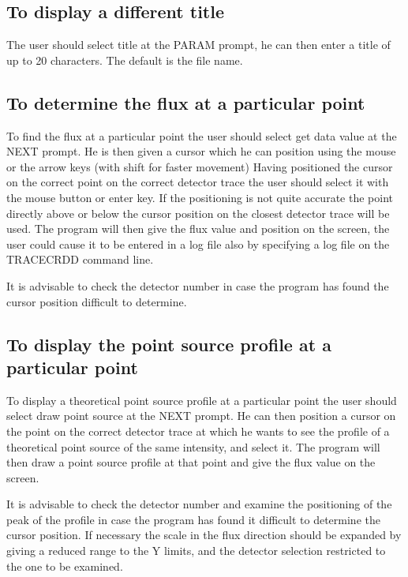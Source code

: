 \documentclass[twoside,11pt]{starlink}
\begin{document}
\subsection{To display a different title}
The user should select title at the PARAM prompt, he can then enter a title of
up to 20 characters. The default is the file name.
\subsection{To determine the flux at a particular point}
To find the flux at a particular point the user should select get data value at
the NEXT prompt. He is then given a cursor which he can position using the mouse
or the arrow keys (with shift for faster movement) Having positioned the cursor
on the correct point on the correct detector trace the user should select it
with the mouse button or enter key. If the positioning is not quite accurate
the point directly above or below the cursor position on the closest detector
trace will be used. The program will then give the flux value and position on
the screen, the user could cause it to be entered in a log file also by
specifying a log file on the TRACECRDD command line.
\begin{small}
\end{small}
It is advisable to check the detector number in case the program has found the
cursor position difficult to determine.
\subsection{To display the point source profile at a particular point}
To display a theoretical point source profile at a particular point the user
should select draw point source at the NEXT prompt. He can then position a
cursor on the point on the correct detector trace at which he wants to see the
profile of a theoretical point source of the same intensity, and select it. The
program will then draw a point source profile at that point and give the flux
value on the screen.
\begin{small}
\end{small}
It is advisable to check the detector number and examine the positioning of the
peak of the profile in case the program has found it difficult to determine
the cursor position. If necessary the scale in the flux direction should be
expanded by giving a reduced range to the Y limits, and the detector selection
restricted to the one to be examined.
\end{document}
